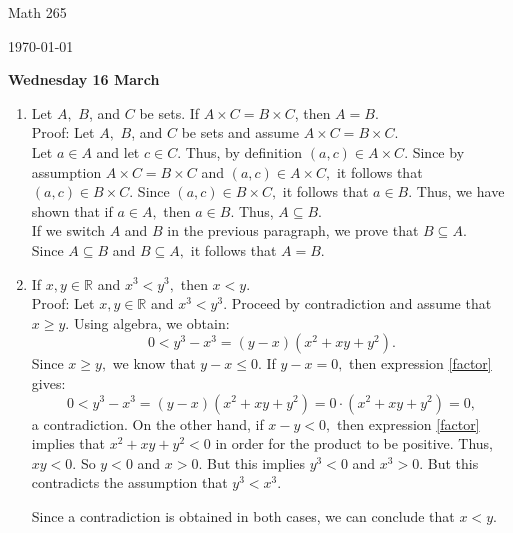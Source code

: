 \documentclass[11pt]{report}
\theoremstyle{plain}
\begin{document}
\hfill Math 265

\hfill \today

\begin{center}
\Large{\textbf{Wednesday 16 March}} \\
\end{center}
\begin{enumerate}
\item Let $A,$ $B$, and $C$ be sets. If $A \times C = B \times C$,  then $A=B.$\\

Proof: Let $A,$ $B$, and $C$ be sets and assume $A \times C = B \times C.$\\

Let $a \in A$ and let $c \in C.$ Thus, by definition $(a,c) \in A \times C.$ Since by assumption $A \times C = B \times C$ and  $(a,c) \in A \times C,$  it follows that $(a,c) \in B \times C.$ Since $(a,c) \in B \times C,$ it follows that $a \in B.$ Thus, we have shown that if $a \in A,$ then $a \in B.$ Thus, $A \subseteq B.$\\

If we switch $A$ and $B$ in the previous paragraph, we prove that $B \subseteq A.$\\

Since $A \subseteq B$ and $B \subseteq A,$ it follows that $A=B.$\\

\item If $x,y \in \mathbb{R}$ and $x^3 < y^3,$ then $x < y.$\\

Proof: Let $x,y \in \mathbb{R}$ and $x^3 < y^3.$ Proceed by contradiction and assume that $x \geq y.$ Using algebra, we obtain:
\begin{equation} \label{factor} 0 < y^3-x^3=(y-x)(x^2+xy+y^2).\end{equation}
Since $x \geq y,$ we know that $y-x \leq 0.$ If $y-x=0,$ then expression \ref{factor} gives:
\begin{equation} 0 < y^3-x^3=(y-x)(x^2+xy+y^2)=0\cdot(x^2+xy+y^2)=0,\end{equation}
a contradiction. On the other hand, if $x-y<0,$ then expression \ref{factor} implies that $x^2+xy+y^2<0$ in order for the product to be positive. Thus, $xy < 0.$ So $y<0$ and $x>0.$ But this implies $y^3<0$ and $x^3 >0.$ But this contradicts the assumption that $y^3 < x^3.$

Since a contradiction is obtained in both cases, we can conclude that $x < y.$\\


\end{enumerate}
\end{document}
